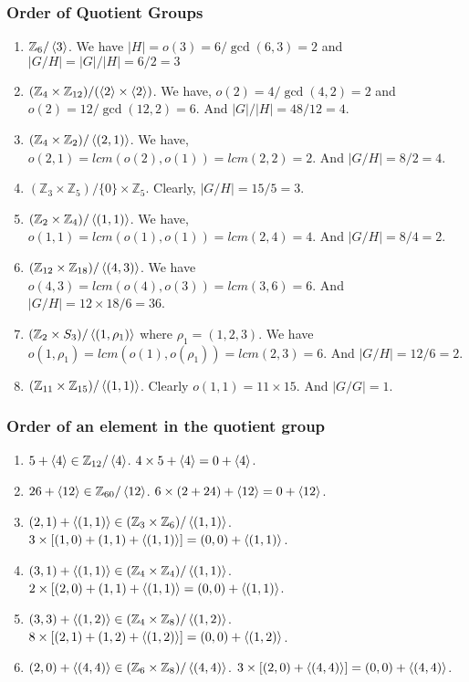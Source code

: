\subsubsection{Order of Quotient Groups}
\begin{enumerate}
	\item $\mathbb{Z}_6/\left\langle 3 \right\rangle$.
	We have $|H| = o(3) = 6/\gcd(6,3) = 2$ and $|G/H| = |G|/|H| = 6/2 = 3$
	\item $(\mathbb{Z}_4 \times \mathbb{Z}_{12})/(\left\langle 2 \right\rangle \times \left\langle 2 \right\rangle)$.
	We have, $o(2)=4/\gcd(4,2) = 2$ and $o(2) = 12/\gcd(12,2) = 6$. And $|G|/|H| = 48/12 = 4$.
	\item $(\mathbb{Z}_4 \times \mathbb{Z}_2)/\left\langle (2,1) \right\rangle$.
	We have, $o(2,1) = lcm(o(2),o(1)) = lcm(2,2) = 2$. And $|G/H| = 8/2 = 4$.
	\item $(\mathbb{Z}_3 \times \mathbb{Z}_5)/\{0\} \times \mathbb{Z}_5$.
	Clearly, $|G/H| = 15/5 = 3$.
	\item $(\mathbb{Z}_2 \times \mathbb{Z}_4)/\left\langle (1,1) \right\rangle$.
	We have, $o(1,1) = lcm(o(1),o(1)) = lcm(2,4) = 4$. And $|G/H| = 8/4 = 2$.
	\item $(\mathbb{Z}_{12} \times \mathbb{Z}_{18})/\left\langle (4,3) \right\rangle$.
	We have $o(4,3) = lcm(o(4),o(3)) = lcm(3,6) = 6$. And $|G/H| = 12 \times 18/6 = 36$.
	\item $(\mathbb{Z}_2 \times S_3)/\left\langle (1,\rho_1) \right\rangle$ where $\rho_1 = (1,2,3)$.
	We have $o(1,\rho_1) = lcm(o(1),o(\rho_1)) = lcm(2,3) = 6$. And $|G/H| = 12/6 = 2$.
	\item $(\mathbb{Z}_{11} \times \mathbb{Z}_{15})/\left\langle (1,1) \right\rangle$.
	Clearly $o(1,1) = 11 \times 15$. And $|G/G| = 1$.
\end{enumerate}

\subsubsection{Order of an element in the quotient group}
\begin{enumerate}
	\item $5+\left\langle 4 \right\rangle \in \mathbb{Z}_{12}/\left\langle 4 \right\rangle$.
	$4 \times 5+\left\langle 4 \right\rangle = 0+\left\langle 4 \right\rangle$.
	\item $26+\left\langle 12 \right\rangle \in \mathbb{Z}_{60}/\left\langle 12 \right\rangle$.
	$6 \times (2+24)+\left\langle 12 \right\rangle = 0 + \left\langle 12 \right\rangle$.	
	\item $(2,1)+\left\langle (1,1) \right\rangle \in (\mathbb{Z}_3 \times \mathbb{Z}_6)/\left\langle (1,1) \right\rangle$.
	$3 \times [(1,0)+(1,1)+\left\langle (1,1) \right\rangle] = (0,0) + \left\langle (1,1) \right\rangle$.
	\item $(3,1)+\left\langle (1,1) \right\rangle \in (\mathbb{Z}_4 \times \mathbb{Z}_4)/\left\langle (1,1) \right\rangle$.
	$2 \times [(2,0)+(1,1)+\left\langle (1,1) \right\rangle = (0,0) + \left\langle (1,1) \right\rangle$.
	\item $(3,3) + \left\langle (1,2) \right\rangle \in (\mathbb{Z}_4 \times \mathbb{Z}_8)/\left\langle (1,2) \right\rangle$.
	$8 \times [(2,1) + (1,2)+\left\langle (1,2) \right\rangle] = (0,0) + \left\langle (1,2) \right\rangle$.
	\item $(2,0) + \left\langle (4,4) \right\rangle \in (\mathbb{Z}_6 \times \mathbb{Z}_8)/\left\langle (4,4) \right\rangle$.
	$3 \times [(2,0)+\left\langle (4,4) \right\rangle] = (0,0) + \left\langle (4,4) \right\rangle$.
\end{enumerate}

